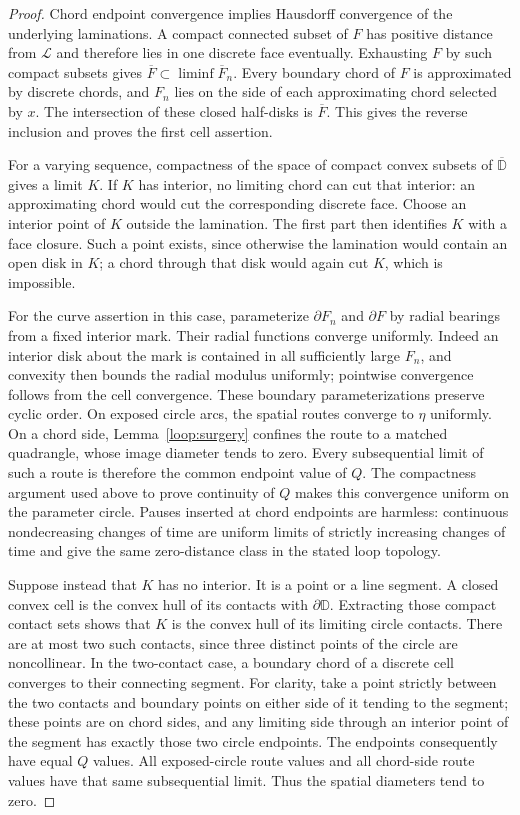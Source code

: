 \begin{proof}
Chord endpoint convergence implies Hausdorff convergence of the underlying
laminations.  A compact connected subset of $F$ has positive distance
from $\mathcal L$ and therefore lies in one discrete face eventually.
Exhausting $F$ by such compact subsets gives
$\overline F\subset\liminf\overline F_n$.  Every boundary chord of $F$
is approximated by discrete chords, and $F_n$ lies on the side of each
approximating chord selected by $x$.  The intersection of these closed
half-disks is $\overline F$.  This gives the reverse inclusion and proves
the first cell assertion.

For a varying sequence, compactness of the space of compact convex
subsets of $\overline{\mathbb D}$ gives a limit $K$.  If $K$ has interior,
no limiting chord can cut that interior: an approximating chord would
cut the corresponding discrete face.  Choose an interior point of $K$
outside the lamination.  The first part then identifies $K$ with a face
closure.  Such a point exists, since otherwise the lamination would
contain an open disk in $K$; a chord through that disk would again cut
$K$, which is impossible.

For the curve assertion in this case, parameterize $\partial F_n$ and
$\partial F$ by radial bearings from a fixed interior mark.  Their radial
functions converge uniformly.  Indeed an interior disk about the mark is
contained in all sufficiently large $F_n$, and convexity then bounds the
radial modulus uniformly; pointwise convergence follows from the cell
convergence.  These boundary parameterizations preserve cyclic order.
On exposed circle arcs, the spatial routes converge to $\eta$ uniformly.
On a chord side, Lemma~\ref{loop:surgery} confines the route to a matched
quadrangle, whose image diameter tends to zero.  Every subsequential
limit of such a route is therefore the common endpoint value of $Q$.
The compactness argument used above to prove continuity of $Q$ makes this
convergence uniform on the parameter circle.  Pauses inserted at chord
endpoints are harmless: continuous nondecreasing changes of time are
uniform limits of strictly increasing changes of time and give the same
zero-distance class in the stated loop topology.

Suppose instead that $K$ has no interior.  It is a point or a line
segment.  A closed convex cell is the convex hull of its contacts with
$\partial\mathbb D$.  Extracting those compact contact sets shows that
$K$ is the convex hull of its limiting circle contacts.  There are at most
two such contacts, since three distinct points of the circle are
noncollinear.  In the two-contact case, a boundary chord of a discrete
cell converges to their connecting segment.  For clarity, take a point
strictly between the two contacts and boundary points on either side of
it tending to the segment; these points are on chord sides, and any
limiting side through an interior point of the segment has exactly those
two circle endpoints.  The endpoints consequently have equal $Q$ values.
All exposed-circle route values and all chord-side route values have that
same subsequential limit.  Thus the spatial diameters tend to zero.


\end{proof}
